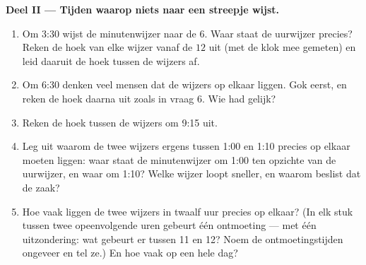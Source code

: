 \begin{problem}
\medskip
\noindent\textbf{Deel II --- Tijden waarop niets naar een streepje wijst.}
\begin{enumerate}[resume]
  \item Om 3:30 wijst de minutenwijzer naar de $6$. Waar staat de uurwijzer
        precies? Reken de hoek van elke wijzer vanaf de $12$ uit (met de klok
        mee gemeten) en leid daaruit de hoek tussen de wijzers af.
  \item Om 6:30 denken veel mensen dat de wijzers op elkaar liggen. Gok eerst,
        en reken de hoek daarna uit zoals in vraag 6. Wie had gelijk?
  \item Reken de hoek tussen de wijzers om 9:15 uit.
  \item Leg uit waarom de twee wijzers ergens tussen 1:00 en 1:10 precies op
        elkaar moeten liggen: waar staat de minutenwijzer om 1:00 ten opzichte
        van de uurwijzer, en waar om 1:10? Welke wijzer loopt sneller, en
        waarom beslist dat de zaak?
  \item Hoe vaak liggen de twee wijzers in twaalf uur precies op elkaar? (In
        elk stuk tussen twee opeenvolgende uren gebeurt één ontmoeting ---
        met één uitzondering: wat gebeurt er tussen 11 en 12? Noem de
        ontmoetingstijden ongeveer en tel ze.) En hoe vaak op een hele dag?
\end{enumerate}


\end{problem}

